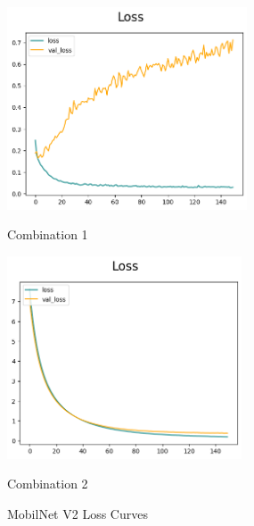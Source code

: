 \begin{figure}[H]
    \centering
    \begin{minipage}[b]{0.49\textwidth}
        \centering
        \includegraphics[width=\textwidth, height=6cm]{Figures/balanced_data/more_data/withoutbn/mn2/loss.png}
        \captionsetup{labelformat=empty}
        \caption{Combination 1}
        \label{fig:u_wo_r_l}
    \end{minipage}
    \hfill
    \begin{minipage}[b]{0.49\textwidth}
        \centering
        \includegraphics[width=\textwidth, height=6cm]{Figures/balanced_data/more_data/withbn/mn2/loss.png}
        \captionsetup{labelformat=empty}
        \caption{Combination 2}
        \label{fig:u_w_r_l}
    \end{minipage}
    \captionsetup{labelformat=default}
    \caption{MobilNet V2 Loss Curves}
\end{figure}

